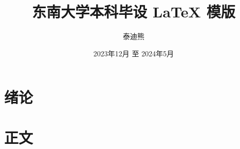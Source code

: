 \documentclass[degree = m, fontset = mac ms]{seuthesis2024} %
\title{东南大学本科毕设 \LaTeX{} 模版}
\author{泰迪熊}
\date{2023年12月 至 2024年5月}
\begin{document}
  \maketitle

  \chapter{绪论}\label{chap:introduction}
  
    
  \chapter{正文}\label{chap:body}
  




  
  \anony{%
    \chapterAck
  }{}

  \chapterBio
  
\end{document}
